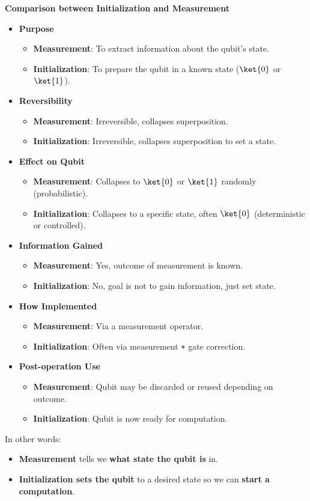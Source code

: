 \highspace
\begin{flushleft}
    \textcolor{Green3}{ \textbf{Comparison between Initialization and Measurement}}
\end{flushleft}
\begin{itemize}
    \item \textcolor{Green3}{\textbf{Purpose}}
    \begin{itemize}
        \item \textbf{Measurement}: To extract information about the qubit's state.
        \item \textbf{Initialization}: To prepare the qubit in a known state ($\ket{0}$ or $\ket{1}$).
    \end{itemize}
    \item \textcolor{Green3}{\textbf{Reversibility}}
    \begin{itemize}
        \item \textbf{Measurement}: Irreversible, collapses superposition.
        \item \textbf{Initialization}: Irreversible, collapses superposition to set a state.
    \end{itemize}
    \item \textcolor{Green3}{\textbf{Effect on Qubit}}
    \begin{itemize}
        \item \textbf{Measurement}: Collapses to $\ket{0}$ or $\ket{1}$ randomly (probabilistic).
        \item \textbf{Initialization}: Collapses to a specific state, often $\ket{0}$ (deterministic or controlled).
    \end{itemize}
    \item \textcolor{Green3}{\textbf{Information Gained}}
    \begin{itemize}
        \item \textbf{Measurement}: Yes, outcome of measurement is known.
        \item \textbf{Initialization}: No, goal is not to gain information, just set state.
    \end{itemize}
    \item \textcolor{Green3}{\textbf{How Implemented}}
    \begin{itemize}
        \item \textbf{Measurement}: Via a measurement operator.
        \item \textbf{Initialization}: Often via measurement \texttt{+} gate correction.
    \end{itemize}

    \newpage

    \item \textcolor{Green3}{\textbf{Post-operation Use}}
    \begin{itemize}
        \item \textbf{Measurement}: Qubit may be discarded or reused depending on outcome.
        \item \textbf{Initialization}: Qubit is now ready for computation.
    \end{itemize}
\end{itemize}
In other words:
\begin{itemize}
    \item \textbf{Measurement} tells we \textbf{what state the qubit is} in.
    \item \textbf{Initialization sets the qubit} to a desired state so we can \textbf{start a computation}.
\end{itemize}
